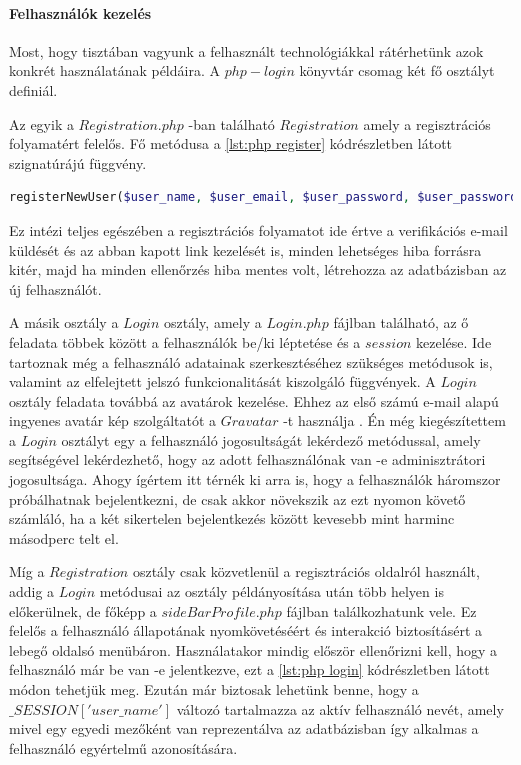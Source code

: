 \documentclass[12pt]{report}
\theoremstyle{definition}
\begin{document}
	\paragraph{Felhasználók kezelés}
	Most, hogy tisztában vagyunk a felhasznált technológiákkal rátérhetünk azok konkrét használatának példáira. A $php-login$ könyvtár csomag két fő osztályt definiál. 
	
	Az egyik a $Registration.php$ -ban található $Registration$ amely a regisztrációs folyamatért felelős. Fő metódusa a \ref{lst:php register} kódrészletben látott szignatúrájú függvény.
	
	\noindent\begin{minipage}{\linewidth}
		\begin{lstlisting}[language=php,label={lst:php register}, caption={php-login registerNewUser szignatúra}]
registerNewUser($user_name, $user_email, $user_password, $user_password_repeat, $captcha)
		\end{lstlisting}
	\end{minipage}
	
	Ez intézi teljes egészében a regisztrációs folyamatot ide értve a verifikációs e-mail küldését és az abban kapott link kezelését is, minden lehetséges hiba forrásra kitér, majd ha minden ellenőrzés hiba mentes volt, létrehozza az adatbázisban az új felhasználót.
	
	A másik osztály a $Login$ osztály, amely a $Login.php$ fájlban található, az ő feladata többek között a felhasználók be/ki léptetése és a $session$ kezelése. Ide tartoznak még a felhasználó adatainak szerkesztéséhez szükséges metódusok is, valamint az elfelejtett jelszó funkcionalitását kiszolgáló függvények. A $Login$ osztály feladata továbbá az avatárok kezelése. Ehhez az első számú e-mail alapú ingyenes avatár kép szolgáltatót a $Gravatar$ -t használja \cite{Gravatar}. Én még kiegészítettem a $Login$ osztályt egy a felhasználó jogosultságát lekérdező metódussal, amely segítségével lekérdezhető, hogy az adott felhasználónak van -e adminisztrátori jogosultsága. Ahogy ígértem itt térnék ki arra is, hogy a felhasználók háromszor próbálhatnak bejelentkezni, de csak akkor növekszik az ezt nyomon követő számláló, ha a két sikertelen bejelentkezés között kevesebb mint harminc másodperc telt el.
	
	Míg a $Registration$ osztály csak közvetlenül a regisztrációs oldalról használt, addig a $Login$ metódusai az osztály példányosítása után több helyen is előkerülnek, de főképp a $sideBarProfile.php$ fájlban találkozhatunk vele. Ez felelős a felhasználó állapotának nyomkövetéséért és interakció biztosításért a lebegő oldalsó menübáron. Használatakor mindig először ellenőrizni kell, hogy a felhasználó már be van -e jelentkezve, ezt a \ref{lst:php login} kódrészletben látott módon tehetjük meg. Ezután már biztosak lehetünk benne, hogy a $\_SESSION\left['user\_name'\right]$ változó tartalmazza az aktív felhasználó nevét, amely mivel egy egyedi mezőként van reprezentálva az adatbázisban így alkalmas a felhasználó egyértelmű azonosítására.
	
\end{document}
